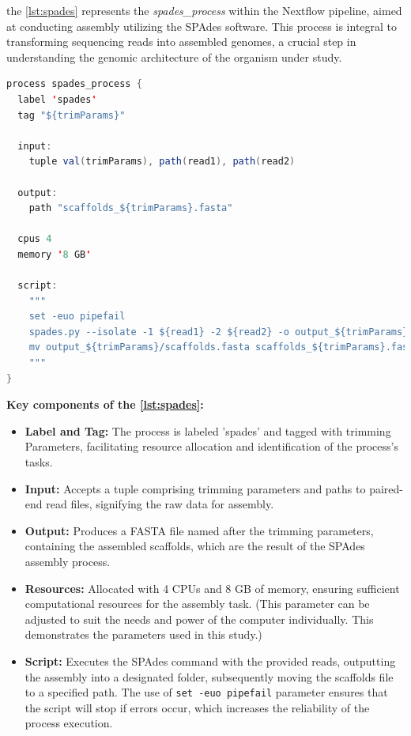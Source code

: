 the \autoref{lst:spades} represents the \textit{spades\_process} within the Nextflow pipeline, aimed at conducting \gls{assembly} utilizing the SPAdes software. This process is integral to transforming sequencing \gls{read}s into assembled \gls{genome}s, a crucial step in understanding the genomic architecture of the organism under study.

\begin{lstlisting}[language=Java, label={lst:spades}, caption={SPAdes Genome Assembly Process in Nextflow}]
process spades_process {
  label 'spades'
  tag "${trimParams}"

  input:
    tuple val(trimParams), path(read1), path(read2)
    
  output:
    path "scaffolds_${trimParams}.fasta"

  cpus 4
  memory '8 GB'

  script:
    """
    set -euo pipefail
    spades.py --isolate -1 ${read1} -2 ${read2} -o output_${trimParams}
    mv output_${trimParams}/scaffolds.fasta scaffolds_${trimParams}.fasta
    """
}
\end{lstlisting}

\textbf{Key components of the \autoref{lst:spades}:}

\begin{itemize}
    \item \textbf{Label and Tag:} The process is labeled 'spades' and tagged with \gls{trimming} Parameters, facilitating resource allocation and identification of the process's tasks.
    \item \textbf{Input:} Accepts a tuple comprising \gls{trimming} parameters and paths to paired-end \gls{read} files, signifying the raw data for \gls{assembly}.
    \item \textbf{Output:} Produces a FASTA file named after the \gls{trimming} parameters, containing the assembled \gls{scaffold}s, which are the result of the SPAdes assembly process.
    \item \textbf{Resources:} Allocated with 4 CPUs and 8 GB of memory, ensuring sufficient computational resources for the assembly task. (This parameter can be adjusted to suit the needs and power of the computer individually. This demonstrates the parameters used in this study.)
    \item \textbf{Script:} Executes the SPAdes command with the provided \gls{read}s, outputting the \gls{assembly} into a designated folder, subsequently moving the \gls{scaffold}s file to a specified path. The use of \texttt{set -euo pipefail} parameter ensures that the script will stop if errors occur, which increases the reliability of the process execution.
\end{itemize}

